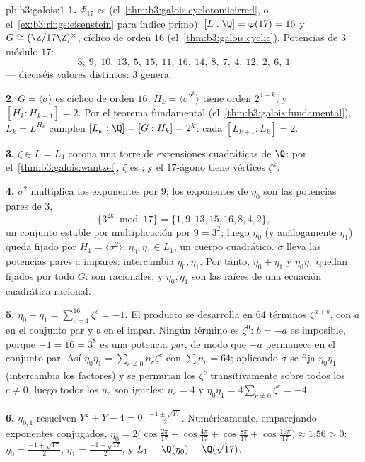 \begin{solution}{pb:b3:galois:1}
\textbf{1.} $\Phi_{17}$ es
(el~\cref{thm:b3:galois:cyclotomicirred}, o
el~\cref{ex:b3:rings:eisenstein} para índice primo): $[L:\Q] =
\varphi(17) = 16$ y $G \cong (\Z/17\Z)^\times$, cíclico de orden $16$
(el~\cref{thm:b3:galois:cyclic}). Potencias de $3$ módulo
$17$:
\[
3,\ 9,\ 10,\ 13,\ 5,\ 15,\ 11,\ 16,\ 14,\ 8,\ 7,\ 4,\ 12,\ 2,\
6,\ 1
\]
--- dieciséis valores distintos: $3$ genera.

\textbf{2.} $G = \langle\sigma\rangle$ es cíclico de orden $16$;
$H_k = \langle\sigma^{2^k}\rangle$ tiene orden $2^{4-k}$, y
$[H_k : H_{k+1}] = 2$. Por el teorema fundamental
(el~\cref{thm:b3:galois:fundamental}), $L_k = L^{H_k}$ cumplen
$[L_k : \Q] = [G : H_k] = 2^k$: cada $[L_{k+1}:L_k] = 2$.

\textbf{3.} $\zeta \in L = L_4$ corona una torre de extensiones
cuadráticas de $\Q$: por el~\cref{thm:b3:galois:wantzel}, $\zeta$ es
\omterm{def:b3:galois:constructible}{construible}; y el $17$-ágono tiene
vértices $\zeta^k$.

\textbf{4.} $\sigma^2$ multiplica los exponentes por $9$; los exponentes
de $\eta_0$ son las potencias pares de $3$,
\[
\{3^{2k} \bmod 17\} = \{1, 9, 13, 15, 16, 8, 4, 2\},
\]
un conjunto estable por multiplicación por $9 = 3^2$; luego $\eta_0$ (y
análogamente $\eta_1$) queda fijado por $H_1 =
\langle\sigma^2\rangle$: $\eta_0, \eta_1 \in L_1$, un cuerpo cuadrático.
$\sigma$ lleva las potencias pares a impares: intercambia $\eta_0,
\eta_1$. Por tanto, $\eta_0 + \eta_1$ y $\eta_0\eta_1$ quedan fijados
por todo $G$: son racionales; y $\eta_0, \eta_1$ son las raíces de una
ecuación cuadrática racional.

\textbf{5.} $\eta_0 + \eta_1 = \sum_{c=1}^{16}\zeta^c = -1$. El producto
se desarrolla en $64$ términos $\zeta^{a + b}$, con $a$ en el conjunto
par y $b$ en el impar. Ningún término es $\zeta^0$: $b = -a$ es
imposible, porque $-1 = 16 = 3^8$ es una potencia \emph{par}, de modo
que $-a$ permanece en el conjunto par. Así
$\eta_0\eta_1 = \sum_{c \neq 0}
n_c\zeta^c$ con $\sum n_c = 64$; aplicando $\sigma$ se fija
$\eta_0\eta_1$ (intercambia los factores) y se permutan los $\zeta^c$
transitivamente sobre todos los $c \neq 0$, luego todos los $n_c$ son
iguales: $n_c
= 4$ y $\eta_0\eta_1 = 4\sum_{c\neq0}\zeta^c = -4$.

\textbf{6.} $\eta_{0,1}$ resuelven $Y^2 + Y - 4 = 0$: $\frac{-1 \pm
\sqrt{17}}2$. Numéricamente, emparejando exponentes conjugados,
$\eta_0 = 2\bigl(\cos\tfrac{2\pi}{17} + \cos\tfrac{4\pi}{17} +
\cos\tfrac{8\pi}{17} + \cos\tfrac{16\pi}{17}\bigr) \approx 1.56
> 0$: $\eta_0 = \frac{-1+\sqrt{17}}2$, $\eta_1 =
\frac{-1-\sqrt{17}}2$, y $L_1 = \Q(\eta_0) = \Q(\sqrt{17})$.


\end{solution}
